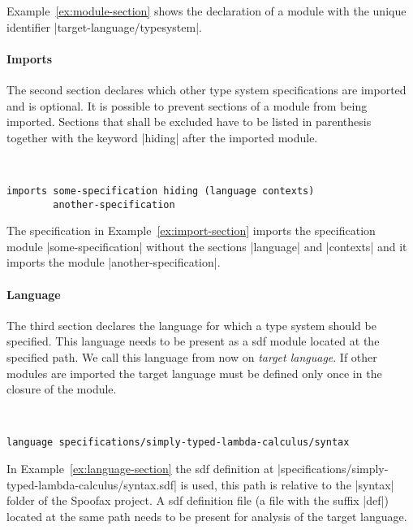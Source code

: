 Example~\ref{ex:module-section} shows the declaration of a module with
the unique identifier \code|target-language/typesystem|.

\paragraph{Imports} The second section declares which other type
system specifications are imported and is optional. It is possible to
prevent sections of a module from being imported. Sections that shall
be excluded have to be listed in parenthesis together with the keyword
\code|hiding| after the imported module.

\begin{example}{~}
\begin{lstlisting}[language=sltc]    
imports some-specification hiding (language contexts)
        another-specification
\end{lstlisting}
\label{ex:import-section}
\end{example}

The specification in Example~\ref{ex:import-section} imports the
specification module \code|some-specification| without the sections
\code|language| and \code|contexts| and it imports the module
\code|another-specification|.

\paragraph{Language} The third section declares the language for which
a type system should be specified. This language needs to be present
as a \gls{sdf} module located at the specified path. We call this
language from now on \emph{target language}. If other modules are
imported the target language must be defined only once in the closure
of the module.

\begin{example}{~}
\begin{lstlisting}[language=sltc]
language specifications/simply-typed-lambda-calculus/syntax
\end{lstlisting}
\label{ex:language-section}
\end{example}

In Example~\ref{ex:language-section} the \gls{sdf} definition at
\code|specifications/simply-typed-lambda-calculus/syntax.sdf| is used,
this path is relative to the \code|syntax| folder of the Spoofax
project. A \gls{sdf} definition file (a file with the suffix
\code|def|) located at the same path needs to be present for analysis
of the target language.  

